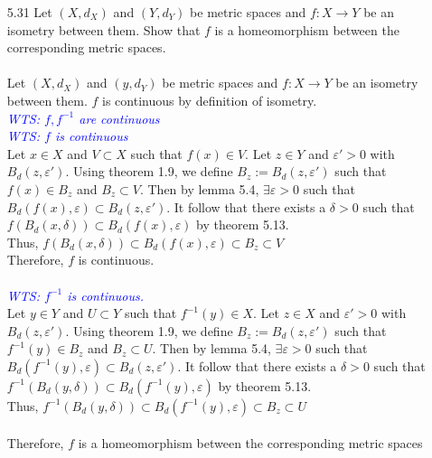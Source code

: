 \documentclass[12pt]{article}
\newcommand{\wts}[1]{\textit{\textcolor{blue}{WTS: #1}}\\}
\newcommand{\1}{^{-1}}
\begin{document}
\begin{enumerate}
	\item[5.31] Let $\left(X, d_{X}\right)$ and $\left(Y, d_{Y}\right)$ be metric spaces and $f: X \rightarrow Y$ be an isometry between them. Show that $f$ is a homeomorphism between the corresponding metric spaces.\\
	\\
	Let $ (X,d_X) $ and $ (y,d_Y) $ be metric spaces and $ f : X \to Y $ be an isometry between them. $ f $ is continuous by definition of isometry.\\
	\wts{$ f,f\1 $ are continuous}
	\wts{$ f $ is continuous}
	Let $ x\in X $ and $ V\subset X $ such that $ f(x)\in V $. Let $ z\in Y $ and $ \varepsilon'>0 $ with $ B_d(z,\varepsilon') $. Using theorem 1.9, we define $ B_z := B_d(z,\varepsilon') $ such that $ f(x) \in B_z $ and $ B_z \subset V $. Then by lemma 5.4, $ \exists \varepsilon >0$ such that $ B_d(f(x),\varepsilon)\subset B_d(z,\varepsilon') $. It follow that there exists a $ \delta > 0  $ such that $ f(B_d(x,\delta))\subset B_d(f(x),\varepsilon) $ by theorem 5.13.\\
	Thus, $ f(B_d(x,\delta))\subset B_d(f(x),\varepsilon) \subset B_z \subset V$\\
	Therefore, $ f $ is continuous.\\
	\\
	\wts{$ f\1 $ is continuous.}
	Let $ y\in Y $ and $ U\subset Y $ such that $ f\1(y)\in X $. Let $ z\in X $ and $ \varepsilon'>0 $ with $ B_d(z,\varepsilon') $. Using theorem 1.9, we define $ B_z := B_d(z,\varepsilon') $ such that $ f\1(y) \in B_z $ and $ B_z \subset U $. Then by lemma 5.4, $ \exists \varepsilon >0$ such that $ B_d(f\1(y),\varepsilon)\subset B_d(z,\varepsilon') $. It follow that there exists a $ \delta > 0  $ such that $ f\1(B_d(y,\delta))\subset B_d(f\1(y),\varepsilon) $ by theorem 5.13.\\
	Thus, $ f\1(B_d(y,\delta))\subset B_d(f\1(y),\varepsilon) \subset B_z \subset U$\\
	\\
	Therefore, $f$ is a homeomorphism between the corresponding metric spaces

	
	


\end{enumerate}
\end{document}
